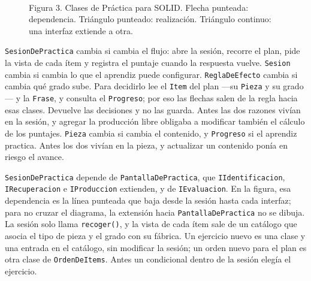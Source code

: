 \documentclass[11pt]{article}
\begin{document}
\begin{figure}[tp]
\\[0.4em]
{\small Figura 3. Clases de Práctica para SOLID. Flecha punteada: dependencia. Triángulo punteado: realización. Triángulo continuo: una interfaz extiende a otra.}
\end{figure}

\begin{description}
  \raggedright
  \item[Responsabilidad única.] \texttt{SesionDePractica} cambia si cambia el flujo: abre la sesión, recorre el plan, pide la vista de cada ítem y registra el puntaje cuando la respuesta vuelve. \texttt{Sesion} cambia si cambia lo que el aprendiz puede configurar. \texttt{ReglaDeEfecto} cambia si cambia qué grado sube. Para decidirlo lee el \texttt{Item} del plan ---su \texttt{Pieza} y su grado--- y la \texttt{Frase}, y consulta el \texttt{Progreso}; por eso las flechas salen de la regla hacia esas clases. Devuelve las decisiones y no las guarda. Antes las dos razones vivían en la sesión, y agregar la producción libre obligaba a modificar también el cálculo de los puntajes. \texttt{Pieza} cambia si cambia el contenido, y \texttt{Progreso} si el aprendiz practica. Antes los dos vivían en la pieza, y actualizar un contenido ponía en riesgo el avance.
  \item[Abierto/cerrado.] \texttt{SesionDePractica} depende de \texttt{PantallaDePractica}, que \texttt{IIdentificacion}, \texttt{IRecuperacion} e \texttt{IProduccion} extienden, y de \texttt{IEvaluacion}. En la figura, esa dependencia es la línea punteada que baja desde la sesión hasta cada interfaz; para no cruzar el diagrama, la extensión hacia \texttt{PantallaDePractica} no se dibuja. La sesión solo llama \texttt{recoger()}, y la vista de cada ítem sale de un catálogo que asocia el tipo de pieza y el grado con su fábrica. Un ejercicio nuevo es una clase y una entrada en el catálogo, sin modificar la sesión; un orden nuevo para el plan es otra clase de \texttt{OrdenDeItems}. Antes un condicional dentro de la sesión elegía el ejercicio.

\end{description}
\end{document}
